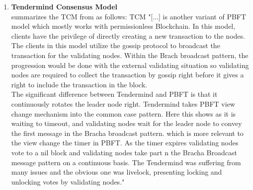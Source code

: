 \begin{enumerate}
	\item \textbf{Tendermind Consensus Model} \label{sec:TendermindCM} \\
	\citet[4]{Khan.2020} summarizes the \gls{TCM} from \cite{Kwon.2014} as follows:
	\gls{TCM} "[...] is another variant of \gls{PBFT} model which mostly works with permissionless Blockchain.
	In this model, clients have the privilege of directly creating a new transaction to the nodes.
	The clients in this model utilize the gossip protocol to broadcast the transaction for the validating nodes.
	Within the Brach broadcast pattern, the progression would be done with the external validating situation so
	validating nodes are required to collect the transaction by gossip right before it gives a right to include the transaction in the block. \\
	The significant difference between Tendermind and \gls{PBFT} is that it continuously rotates the leader node right.
	Tendermind takes \gls{PBFT} view change mechanism into the common case pattern.
	Here this shows as it is waiting to timeout, and validating nodes wait for the leader node to convey the first message in the Bracha broadcast pattern.
	which is more relevant to the view change the timer in \gls{PBFT}.
	As the timer expires validating nodes vote to a nil block and validating nodes take part n the Bracha Broadcast message pattern on a continuous basis.
	The Tendermind was suffering from many issues and the obvious one was livelock, presenting locking and unlocking votes by validating nodes."
	
\end{enumerate}

